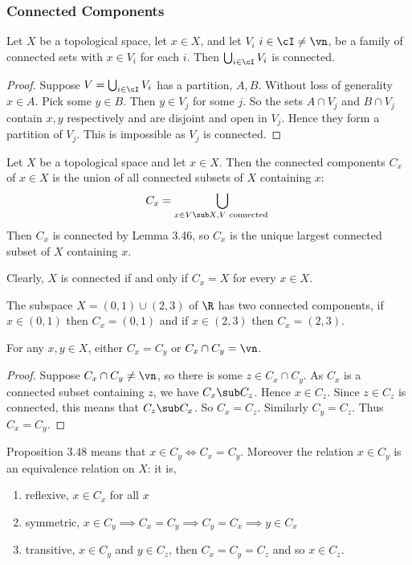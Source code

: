 \subsubsection{Connected Components}
\begin{nlemma}
  Let $X$ be a topological space, let $x \in X$, and let $V_i$ $i \in \cI \ne \vn$, be a family of connected sets with $x \in V_i$ for each $i$. Then $\bigcup_{i \in \cI} V_i$ is connected.
\end{nlemma}
\begin{proof}
  Suppose $V = \bigcup_{i \in \cI} V_i$ has a partition, $A, B$. Without loss of generality $x \in A$. Pick some $y \in B$. Then $y \in V_j$ for some $j$. So the sets $A \cap V_j$ and $B \cap V_j$ contain $x, y$ respectively and are disjoint and open in $V_j$. Hence they form a partition of $V_j$. This is impossible as $V_j$ is connected.
\end{proof}

\begin{ndefi}
  Let $X$ be a topological space and let $x \in X$. Then the connected components $C_x$ of $x \in X$ is the union of all connected subsets of $X$ containing $x$:
  $$ C_x = \bigcup_{x \in V \sub X, V \text{ connected }} $$
  Then $C_x$ is connected by Lemma 3.46, so $C_x$ is the unique largest connected subset of $X$ containing $x$.
\end{ndefi}
\noindent
Clearly, $X$ is connected if and only if $C_x = X$ for every $x \in X$.
\begin{eg}
  The subspace $X = (0,1) \cup (2, 3)$ of $\R$ has two connected components, if $x \in (0, 1)$ then $C_x = (0, 1)$ and if $x \in (2, 3)$ then $C_x = (2, 3)$.
\end{eg}

\begin{nprop}
  For any $x, y \in X$, either $C_x = C_y$ or $C_x \cap C_y = \vn$.
\end{nprop}
\begin{proof}
  Suppose $C_x \cap C_y \ne \vn$, so there is some $z \in C_x \cap C_y$. As $C_x$ is a connected subset containing $z$, we have $C_x \sub C_z$. Hence $x \in C_z$. Since $z \in C_z$ is connected, this means that $C_z \sub C_x$. So $C_x = C_z$. Similarly $C_y = C_z$. Thus $C_x = C_y$.
\end{proof}

\begin{remark}
   Proposition 3.48 means that $x \in C_y \iff C_x = C_y$. Moreover the relation $x \in C_y$ is an equivalence relation on $X$: it is,
   \begin{enumerate}
     \item reflexive, $x \in C_x$ for all $x$
     \item symmetric, $x \in C_y \implies C_x = C_y \implies C_y = C_x \implies y \in C_x$
     \item transitive, $x \in C_y$ and $y \in C_z$, then $C_x = C_y = C_z$ and so $x \in C_z$.
   \end{enumerate}
\end{remark}

